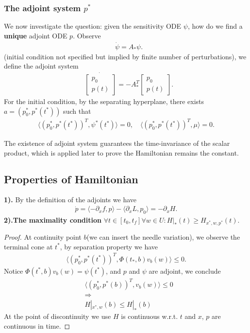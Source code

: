 \documentclass[a4paper,11pt,fleqn]{book}
\theoremstyle{definition}
\theoremstyle{remark}
\begin{document}
\subsubsection{The adjoint system $p^*$}
We now investigate the question: given the sensitivity ODE $\psi$, how do we find a \textbf{unique} adjoint ODE $p$. Observe
\begin{align*}
	& \dot{\psi} = A_* \psi.
\end{align*}
(initial condition not specified but implied by finite number of perturbations), we define the adjoint system
\begin{align*}
	&\dot{\begin{bmatrix}
		p_0\\
		p(t)
	\end{bmatrix}} = - A_*^T 
	\begin{bmatrix}
		p_0\\
		p(t)
	\end{bmatrix}.
\end{align*} 
For the initial condition, by the separating hyperplane, there exists $ a = (p_0^*, p^*(t^*))$ such that 
\begin{align*}
	\langle (p_0^*, p^*(t^*))^T, \psi^*(t^*) \rangle = 0, \quad \langle (p_0^*, p^*(t^*))^T, \mu \rangle = 0. 
\end{align*}

The existence of adjoint system guarantees the time-invariance of the scalar product, which is applied later to prove the Hamiltonian remains the constant.  


\subsection{Properties of Hamiltonian}
\textbf{1).} By the definition of the adjoints we have
\begin{align*}
	\dot{p} = \langle -\partial_x f, p \rangle  - \langle \partial_x L , p_0 \rangle = - \partial_x H. 
\end{align*}
\textbf{2).The maximality condition} $\forall t \in [t_0, t_f] \forall w \in U: H|_*(t) \ge H_{x^*, w, p^*}(t)$. 
\begin{proof}  At continuity point $b$(we can insert the needle variation), we observe the terminal cone at $t^*$, by separation property we have
\begin{align*}
	\langle (p_0^*,  p^*(t^*))^T, \Phi(t_*, b)v_b(w) \rangle \le 0.
\end{align*}	
Notice $\Phi(t^*, b)v_b(w) = \psi(t^*)$, and $p$ and $\psi$ are adjoint, we conclude
\begin{align*}
	&\langle (p_0^*, p^*(b))^T , v_b(w) \rangle \le 0\\
	&\Rightarrow\\
	&H|_{x^*, w}(b) \le H|_{*}(b)
\end{align*}
At the point of discontinuity we use $H$ is continuous w.r.t. $t$ and $x$, $p$ are continuous in time. 
\end{proof}
\end{document}
